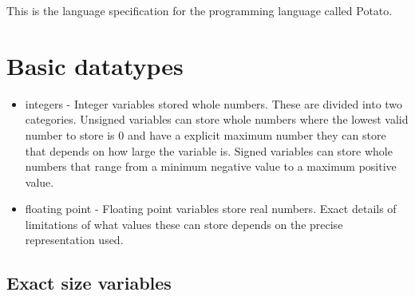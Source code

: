 \documentclass[12pt]{article}
\newcommand{\progLangName}{Potato}
\begin{document}
This is the language specification for the programming language called \progLangName .

\section{Basic datatypes}

\begin{itemize}
\item integers - Integer variables stored whole numbers. These are divided into two categories. Unsigned variables can store whole numbers where the lowest valid number to store is 0 and have a explicit maximum number they can store that depends on how large the variable is. Signed variables can store whole numbers that range from a minimum negative value to a maximum positive value.
\item floating point - Floating point variables store real numbers. Exact details of limitations of what values these can store depends on the precise representation used.
\end{itemize}

\subsection{Exact size variables}
\end{document}
